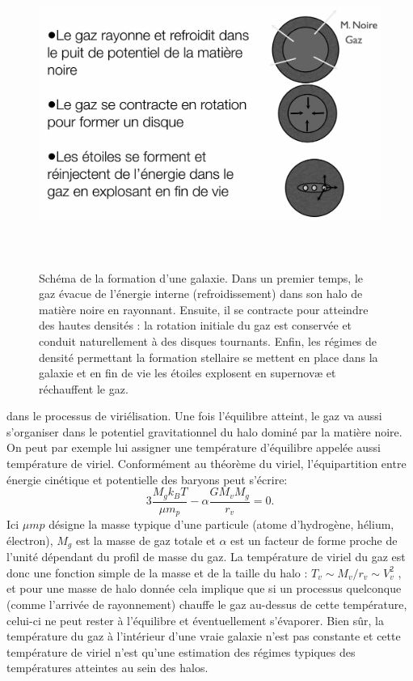 \begin{figure}[htbp]
	\centering
		\includegraphics[height=10cm]{figs/coolgal.png}
		\caption[Formation schématique d'une galaxie]{Schéma de la formation d'une galaxie. Dans un premier temps, le gaz évacue de l'énergie interne (refroidissement) dans son halo de matière noire en rayonnant. Ensuite, il se contracte pour atteindre des hautes densités : la rotation initiale du gaz est conservée et conduit naturellement à des disques tournants. Enfin, les régimes de densité permettant la formation stellaire se mettent en place dans la galaxie et en fin de vie les étoiles explosent en supernovæ et réchauffent le gaz. }
	\label{f:coolgal}
\end{figure}


 dans le processus de viriélisation. Une fois l'équilibre atteint, le gaz va aussi s'organiser dans le potentiel gravitationnel du halo dominé par la matière noire. On peut par exemple lui assigner une température d'équilibre appelée aussi température de viriel. Conformément au théorème du viriel, l'équipartition entre énergie cinétique et potentielle des baryons peut s'écrire:
\begin{equation}
3\frac{M_gk_B T}{\mu m_p} - \alpha \frac{G M_v M_g}{r_v}=0.
\end{equation}
Ici $\mu mp$ désigne la masse typique d'une particule (atome d'hydrogène, hélium, électron), $M_g$ est la masse de gaz totale et $\alpha$ est un facteur de forme proche de l'unité dépendant du profil de masse du gaz. La température de viriel du gaz est donc une fonction simple de la masse et de la taille du halo : $T_v\sim M_v/r_v \sim V_v^2$ , et pour une masse de halo donnée cela implique que si un processus quelconque (comme l'arrivée de rayonnement) chauffe le gaz au-dessus de cette température, celui-ci ne peut rester à l'équilibre et éventuellement s'évaporer. Bien sûr, la température du gaz à l'intérieur d'une vraie galaxie n'est pas constante et cette température de viriel n'est qu'une estimation des régimes typiques des températures atteintes au sein des halos.

